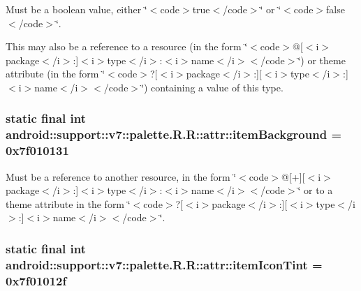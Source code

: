 Must be a boolean value, either \char`\"{}$<$code$>$true$<$/code$>$\char`\"{} or \char`\"{}$<$code$>$false$<$/code$>$\char`\"{}. 

This may also be a reference to a resource (in the form \char`\"{}$<$code$>$@\mbox{[}$<$i$>$package$<$/i$>$:\mbox{]}$<$i$>$type$<$/i$>$:$<$i$>$name$<$/i$>$$<$/code$>$\char`\"{}) or theme attribute (in the form \char`\"{}$<$code$>$?\mbox{[}$<$i$>$package$<$/i$>$:\mbox{]}\mbox{[}$<$i$>$type$<$/i$>$:\mbox{]}$<$i$>$name$<$/i$>$$<$/code$>$\char`\"{}) containing a value of this type. \hypertarget{classandroid_1_1support_1_1v7_1_1palette_1_1_r_1_1attr_195efa3df2b896081a9f2527c09d3760}{
\subsubsection[{itemBackground}]{\setlength{\rightskip}{0pt plus 5cm}static final int android::support::v7::palette.R.R::attr::itemBackground = 0x7f010131}}
\label{classandroid_1_1support_1_1v7_1_1palette_1_1_r_1_1attr_195efa3df2b896081a9f2527c09d3760}


Must be a reference to another resource, in the form \char`\"{}$<$code$>$@\mbox{[}+\mbox{]}\mbox{[}$<$i$>$package$<$/i$>$:\mbox{]}$<$i$>$type$<$/i$>$:$<$i$>$name$<$/i$>$$<$/code$>$\char`\"{} or to a theme attribute in the form \char`\"{}$<$code$>$?\mbox{[}$<$i$>$package$<$/i$>$:\mbox{]}\mbox{[}$<$i$>$type$<$/i$>$:\mbox{]}$<$i$>$name$<$/i$>$$<$/code$>$\char`\"{}. \hypertarget{classandroid_1_1support_1_1v7_1_1palette_1_1_r_1_1attr_002ca0eca322058b2d97b01e7cf346d4}{
\subsubsection[{itemIconTint}]{\setlength{\rightskip}{0pt plus 5cm}static final int android::support::v7::palette.R.R::attr::itemIconTint = 0x7f01012f}}
\label{classandroid_1_1support_1_1v7_1_1palette_1_1_r_1_1attr_002ca0eca322058b2d97b01e7cf346d4}



